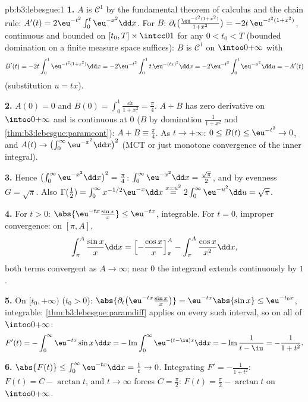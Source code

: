 \begin{solution}{pb:b3:lebesgue:1}
\textbf{1.} $A$ is $\mathcal C^1$ by the fundamental theorem
of calculus and the chain rule: $A'(t) =
2\eu^{-t^2}\int_0^t\eu^{-x^2}\dd x$. For $B$:
$\partial_t\bigl(\frac{\eu^{-t^2(1+x^2)}}{1+x^2}\bigr) =
-2t\,\eu^{-t^2(1+x^2)}$, continuous and bounded on $[t_0, T]
\times \intcc01$ for any $0 < t_0 < T$ (bounded domination on a
finite measure space suffices): $B$ is $\mathcal C^1$ on
$\intoo0{+\infty}$ with
\[
B'(t) = -2t\int_0^1 \eu^{-t^2(1+x^2)}\dd x
= -2\eu^{-t^2}\int_0^1 t\,\eu^{-(tx)^2}\dd x
= -2\eu^{-t^2}\int_0^t\eu^{-u^2}\dd u = -A'(t)
\]
(substitution $u = tx$).

\textbf{2.} $A(0) = 0$ and $B(0) = \int_0^1\frac{\dd x}{1+x^2}
= \frac\pi4$. $A + B$ has zero derivative on
$\intoo0{+\infty}$ and is continuous at $0$ ($B$ by
domination $\frac1{1+x^2}$ and
\cref{thm:b3:lebesgue:paramcont}): $A + B \equiv \frac\pi4$.
As $t\to+\infty$: $0 \leq B(t) \leq \eu^{-t^2} \to 0$, and
$A(t) \to \bigl(\int_0^\infty\eu^{-x^2}\dd x\bigr)^2$ (MCT or
just monotone convergence of the inner integral).

\textbf{3.} Hence $\bigl(\int_0^\infty\eu^{-x^2}\dd x\bigr)^2
= \frac\pi4$: $\int_0^\infty\eu^{-x^2}\dd x =
\frac{\sqrt\pi}2$, and by evenness $G = \sqrt\pi$. Also
$\Gamma(\frac12) = \int_0^\infty x^{-1/2}\eu^{-x}\dd x
\overset{x = u^2}{=} 2\int_0^\infty\eu^{-u^2}\dd u =
\sqrt\pi$.

\textbf{4.} For $t > 0$: $\abs{\eu^{-tx}\frac{\sin x}x} \leq
\eu^{-tx}$, integrable. For $t = 0$, improper convergence: on
$[\pi, A]$,
\[
\int_\pi^A\frac{\sin x}x\dd x
= \Bigl[-\frac{\cos x}x\Bigr]_\pi^A -
\int_\pi^A\frac{\cos x}{x^2}\dd x,
\]
both terms convergent as $A \to \infty$; near $0$ the integrand
extends continuously by $1$.

\textbf{5.} On $[t_0, +\infty)$ ($t_0 > 0$):
$\abs{\partial_t\bigl(\eu^{-tx}\tfrac{\sin x}x\bigr)} =
\eu^{-tx}\abs{\sin x} \leq \eu^{-t_0x}$, integrable:
\cref{thm:b3:lebesgue:paramdiff} applies on every such
interval, so on all of $\intoo0{+\infty}$:
\[
F'(t) = -\int_0^\infty\eu^{-tx}\sin x\,\dd x
= -\operatorname{Im}\int_0^\infty\eu^{-(t - \iu)x}\dd x
= -\operatorname{Im}\frac{1}{t - \iu} = -\frac{1}{1 + t^2}.
\]

\textbf{6.} $\abs{F(t)} \leq \int_0^\infty\eu^{-tx}\dd x =
\frac1t \to 0$. Integrating $F' = -\frac1{1+t^2}$: $F(t) = C -
\arctan t$, and $t \to \infty$ forces $C = \frac\pi2$: $F(t) =
\frac\pi2 - \arctan t$ on $\intoo0{+\infty}$.


\end{solution}
